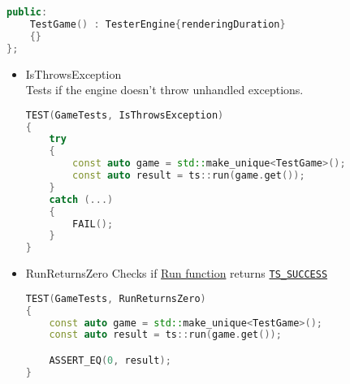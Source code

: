 \begin{itemize}
\begin{lstlisting}[language=c++, caption=TestGame class (./engine/tests/tester.cpp)]
public:
    TestGame() : TesterEngine{renderingDuration}
    {}
};
\end{lstlisting}
        \begin{itemize}
            \item IsThrowsException\\
            Tests if the engine doesn't throw unhandled exceptions.
\begin{lstlisting}[language=c++, caption=IsThrowsException test(./engine/tests/tester.cpp)]
TEST(GameTests, IsThrowsException)
{
    try
    {
        const auto game = std::make_unique<TestGame>();
        const auto result = ts::run(game.get());
    }
    catch (...)
    {
        FAIL();
    }
}
\end{lstlisting}
            \item RunReturnsZero
            Checks if \hyperref[sec:run_fun]{Run function} returns \hyperref[sec:return_codes]{\texttt{TS\_SUCCESS}} 
\begin{lstlisting}[language=c++, caption=RunReturnsZero test(./engine/tests/tester.cpp)]
TEST(GameTests, RunReturnsZero)
{
    const auto game = std::make_unique<TestGame>();
    const auto result = ts::run(game.get());

    ASSERT_EQ(0, result);
}
            \end{lstlisting}
        \end{itemize}
\end{itemize}